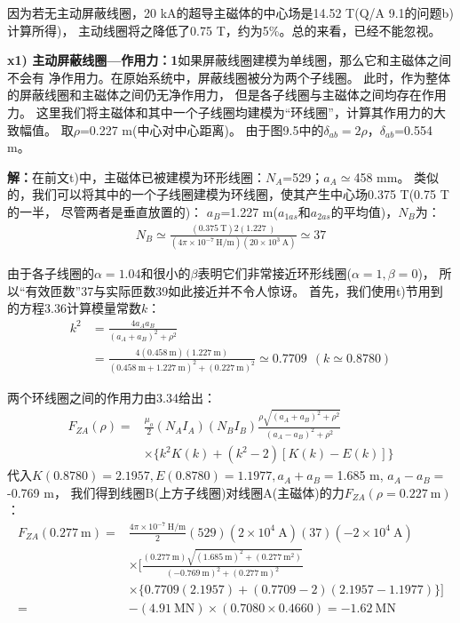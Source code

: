 因为若无主动屏蔽线圈，20 kA的超导主磁体的中心场是14.52 T(Q/A 9.1的问题b)计算所得)，
主动线圈将之降低了0.75 T，约为5\%。总的来看，已经不能忽视。

\textbf{x1) 主动屏蔽线圈---作用力：1}\qquad 如果屏蔽线圈建模为单线圈，那么它和主磁体之间不会有
净作用力。在原始系统中，屏蔽线圈被分为两个子线圈。
此时，作为整体的屏蔽线圈和主磁体之间仍无净作用力，
但是各子线圈与主磁体之间均存在作用力。
这里我们将主磁体和其中一个子线圈均建模为“环线圈”，计算其作用力的大致幅值。
取$\rho$=0.227 m(中心对中心距离)。
由于图9.5中的$\delta_{ab}=2\rho$，$\delta_{ab}$=0.554 m。

\textbf{解：}在前文t)中，主磁体已被建模为环形线圈：$N_A$=529；$a_A\simeq$458 mm。
类似的，我们可以将其中的一个子线圈建模为环线圈，使其产生中心场0.375 T(0.75 T的一半，
尽管两者是垂直放置的)：
$a_B$=1.227 m($a_{1as}$和$a_{2as}$的平均值)，$N_B$为：
\begin{align*}%
N_B\simeq\frac{(0.375\ \mathrm{T})2(1.227\ \mathrm{})}{(4\pi\times 10^{-7}\ \mathrm{H/m})(20\times 10^3\ \mathrm{A})}\simeq 37
\end{align*}

由于各子线圈的$\alpha=1.04$和很小的$\beta$表明它们非常接近环形线圈($\alpha=1,\beta=0$)，
所以“有效匝数”37与实际匝数39如此接近并不令人惊讶。
首先，我们使用t)节用到的方程3.36计算模量常数$k$：
\begin{align*}%
k^2&=\frac{4a_Aa_B}{(a_A+a_B)^2+\rho^2}\\ \tag{3.36}
&=\frac{4(0.458\ \mathrm{m})(1.227\ \mathrm{m})}{(0.458\ \mathrm{m+1.227\ \mathrm{m}})^2+(0.227\ \mathrm{m})^2}\simeq 0.7709\   \ (k\simeq 0.8780)
\end{align*}

两个环线圈之间的作用力由3.34给出：
\begin{align*}%
F_{ZA}(\rho)=&\frac{\mu_o}{2}(N_AI_A)(N_BI_B)\frac{\rho\sqrt{(a_A+a_B)^2+\rho^2}}{(a_A-a_B)^2+\rho^2}\\
&\times\{k^2K(k)+(k^2-2)[K(k)-E(k)]\} \tag{3.34}
\end{align*}
代入$K(0.8780)=2.1957,E(0.8780)=1.1977,a_A+a_B=$1.685 m, $a_A-a_B=$-0.769 m，
我们得到线圈B(上方子线圈)对线圈A(主磁体)的力$F_{ZA}(\rho=0.227\ \mathrm{m})$：
\begin{align*}%
F_{ZA}(0.277\ \mathrm{m})=&\frac{4\pi\times 10^{-7}\ \mathrm{H/m}}{2}(529)(2\times 10^4\  \mathrm{A})(37)(-2\times 10^{4}\ \mathrm{A})\\
&\times \big[\frac{(0.277\ \mathrm{m})\sqrt{(1.685\ \mathrm{m})^2+(0.277\ \mathrm{m}^2)}}{(-0.769\ \mathrm{m})^2+(0.277\ \mathrm{m})^2}\\
&\times\{0.7709(2.1957)+(0.7709-2)(2.1957-1.1977)\}\big]\\
=&-(4.91\ \mathrm{MN})\times(0.7080\times 0.4660)=-1.62\ \mathrm{MN}
\end{align*}

